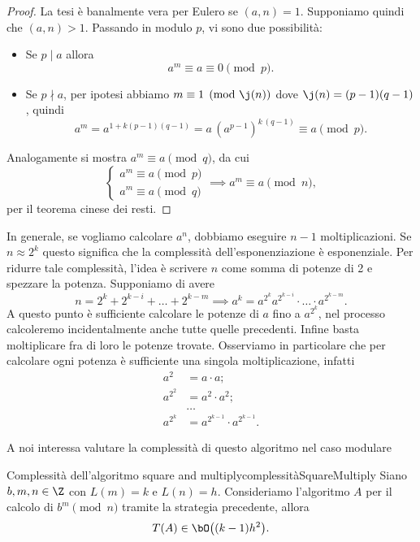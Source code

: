 	\begin{proof}
	La tesi è banalmente vera per Eulero se \((a,n)=1\). Supponiamo quindi che \((a,n)>1\).
	Passando in modulo \(p\), vi sono due possibilità:
	\begin{itemize}
		\item Se \(p\mid a\) allora
			\[
			a^m \equiv a \equiv 0 \pmod{p}.
			\]
		\item Se \(p\nmid a\), per ipotesi abbiamo \(m\equiv 1 \pmod{\j(n)}\) dove \(\j(n)=(p-1)(q-1)\), quindi
			\[
			a^m = a^{1+k(p-1)(q-1)} = a\,(a^{p-1})^{k\,(q-1)} \equiv a \pmod{p}.
			\]
	\end{itemize}
	Analogamente si mostra \(a^m \equiv a \pmod{q}\), da cui
		\[
		\begin{cases}
		a^m \equiv a \pmod{p}\\
		a^m \equiv a \pmod{q}
		\end{cases}
		\implies a^m \equiv a \pmod{n},
		\]
	per il teorema cinese dei resti.
	\end{proof}

	In generale, se vogliamo calcolare \(a^n\), dobbiamo eseguire \(n-1\) moltiplicazioni.
	Se \(n\approx 2^k\) questo significa che la complessità dell'esponenziazione è esponenziale.
	Per ridurre tale complessità, l'idea è scrivere \(n\) come somma di potenze di 2 e spezzare la potenza.
	Supponiamo di avere
		\[
		n = 2^k + 2^{k-i} + \ldots + 2^{k-m} \implies a^k = a^{2^k}a^{2^{k-i}} \cdot\ldots\cdot a^{2^{k-m}}.
		\]
	A questo punto è sufficiente calcolare le potenze di \(a\) fino a \(a^{2^k}\), nel processo calcoleremo incidentalmente anche tutte quelle precedenti. Infine basta moltiplicare fra di loro le potenze trovate.
	Osserviamo in particolare che per calcolare ogni potenza è sufficiente una singola moltiplicazione, infatti
		\begin{align*}
		a^2 & = a \cdot a;\\
		a^{2^2} & = a^2 \cdot a^2;\\
		& \ldots\\
		a^{2^k} & = a^{2^{k-1}} \cdot a^{2^{k-1}}.
		\end{align*}

	A noi interessa valutare la complessità di questo algoritmo nel caso modulare

	\begin{prop}{Complessità dell'algoritmo square and multiply}{complessitàSquareMultiply}
	Siano \(b,m,n\in \Z\) con \(L(m) = k\) e \(L(n) = h\).
	Consideriamo l'algoritmo \(A\) per il calcolo di \(b^m \pmod{n}\) tramite la strategia precedente, allora
		\[
		T(A) \in \bO\big((k-1)h^2\big).
		\]
	\end{prop}

